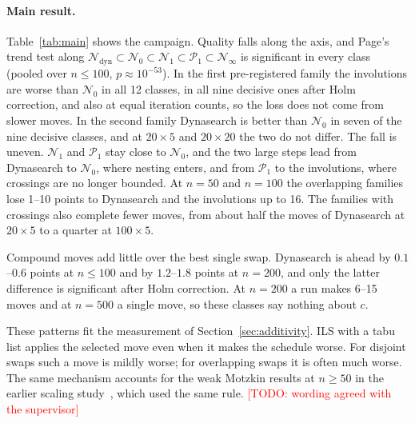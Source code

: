 \documentclass{article}
\newcommand{\todo}[1]{\textcolor{red}{[TODO: #1]}}
\newcommand{\N}{\mathcal{N}}
\newcommand{\Pa}{\mathcal{P}}
\begin{document}
\paragraph{Main result.} Table~\ref{tab:main} shows the campaign.
Quality falls along the axis, and Page's trend test along
$\N_{\mathrm{dyn}}\subset\N_0\subset\N_1\subset\Pa_1\subset\N_\infty$
is significant in every class (pooled over $n\leq100$, $p\approx10^{-53}$).
In the first pre-registered family the involutions are worse than
$\N_0$ in all 12 classes, in all nine decisive ones after Holm
correction, and also at equal iteration counts, so the loss does not
come from slower moves. In the second family Dynasearch is better than
$\N_0$ in seven of the nine decisive classes, and at $20\times5$ and
$20\times20$ the two do not differ. The fall is uneven. $\N_1$ and
$\Pa_1$ stay close to $\N_0$, and the two large steps lead from
Dynasearch to $\N_0$, where nesting enters, and from $\Pa_1$ to the
involutions, where crossings are no longer bounded. At $n=50$ and
$n=100$ the overlapping families lose 1--10 points to Dynasearch and
the involutions up to 16. The families with crossings also complete
fewer moves, from about half the moves of Dynasearch at $20\times5$ to a
quarter at $100\times5$.

Compound moves add little over the best single swap. Dynasearch is ahead
by $0.1$--$0.6$ points at $n\leq100$ and by $1.2$--$1.8$ points at
$n=200$, and only the latter difference is significant after Holm
correction. At $n=200$ a run makes 6--15 moves and at $n=500$ a single
move, so these classes say nothing about $c$.

These patterns fit the measurement of Section~\ref{sec:additivity}. ILS
with a tabu list applies the selected move even when it makes the
schedule worse. For disjoint swaps such a move is mildly worse; for
overlapping swaps it is often much worse. The same mechanism accounts
for the weak Motzkin results at $n\geq50$ in the earlier scaling
study~\cite{windowed_own}, which used the same rule.
\todo{wording agreed with the supervisor}
\end{document}

